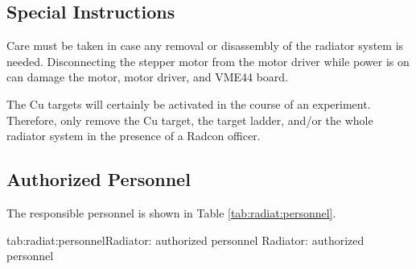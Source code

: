 {\begin{safetyen}{10}{10}
\subsection{Special Instructions}

Care must be taken in case any removal or disassembly of the radiator
system is needed.
Disconnecting the stepper motor from the motor driver
while power is on can damage the motor, motor driver, and VME44 board.

The Cu targets will certainly be activated in the course of an experiment.
Therefore, only remove the Cu target, the target ladder,
and/or the whole radiator system in the presence of a Radcon officer.
\end{safetyen}

} %

\begin{safetyen}{10}{15}
\subsection{ Authorized Personnel}
\end{safetyen}

The responsible personnel is shown in Table \ref{tab:radiat:personnel}.
\begin{namestab}{tab:radiat:personnel}{Radiator: authorized personnel}{%
   Radiator: authorized personnel}
\end{namestab}

%
%
%
%
%
%
%
